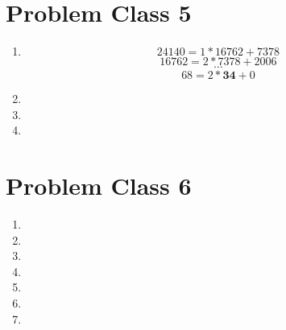 \section{Problem Class 5}
	\begin{enumerate}
		\item
		$$ 24140 = 1 * 16762 + 7378 $$
		$$ 16762 = 2 * 7378 + 2006 $$
		$$ \cdots $$
		$$ 68 = 2 * \mathbf{34} + 0 $$
		\item
		\item
		\item
	\end{enumerate}

\section{Problem Class 6}
	\begin{enumerate}
		\item
		\item
		\item
		\item
		\item
		\item
		\item
	\end{enumerate}

